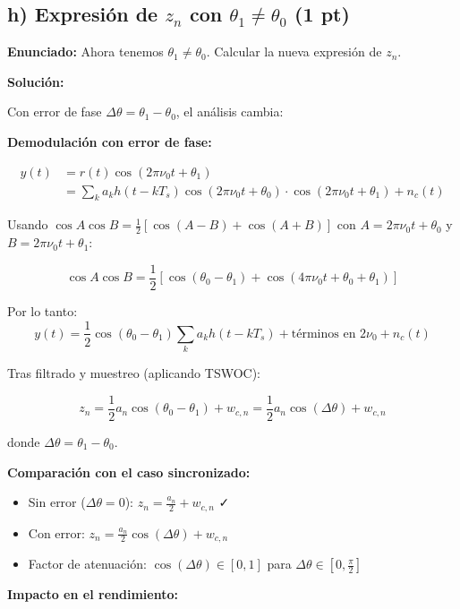 \documentclass[11pt,a4paper]{article}
\begin{document}
\subsection*{h) Expresi\'on de $z_n$ con $\theta_1 \neq \theta_0$ (1 pt)}

\textbf{Enunciado:} Ahora tenemos $\theta_1 \neq \theta_0$. Calcular la nueva expresi\'on de $z_n$.

\vspace{0.3cm}
\textbf{Soluci\'on:}

Con error de fase $\Delta\theta = \theta_1 - \theta_0$, el an\'alisis cambia:

\textbf{Demodulaci\'on con error de fase:}

\begin{align*}
y(t) &= r(t) \cos(2\pi\nu_0 t + \theta_1) \\
&= \sum_{k} a_k h(t-kT_s)\cos(2\pi\nu_0 t + \theta_0) \cdot \cos(2\pi\nu_0 t + \theta_1) + n_c(t)
\end{align*}

Usando $\cos A \cos B = \frac{1}{2}[\cos(A-B) + \cos(A+B)]$ con $A = 2\pi\nu_0 t + \theta_0$ y $B = 2\pi\nu_0 t + \theta_1$:

\[
\cos A \cos B = \frac{1}{2}[\cos(\theta_0 - \theta_1) + \cos(4\pi\nu_0 t + \theta_0 + \theta_1)]
\]

Por lo tanto:
\[
y(t) = \frac{1}{2}\cos(\theta_0 - \theta_1) \sum_k a_k h(t-kT_s) + \text{t\'erminos en } 2\nu_0 + n_c(t)
\]

Tras filtrado y muestreo (aplicando TSWOC):

\[
\boxed{z_n = \frac{1}{2} a_n \cos(\theta_0 - \theta_1) + w_{c,n} = \frac{1}{2} a_n \cos(\Delta\theta) + w_{c,n}}
\]

donde $\Delta\theta = \theta_1 - \theta_0$.

\textbf{Comparaci\'on con el caso sincronizado:}

\begin{itemize}
    \item Sin error ($\Delta\theta = 0$): $z_n = \frac{a_n}{2} + w_{c,n}$ ✓
    
    \item Con error: $z_n = \frac{a_n}{2}\cos(\Delta\theta) + w_{c,n}$
    
    \item Factor de atenuaci\'on: $\cos(\Delta\theta) \in [0, 1]$ para $\Delta\theta \in [0, \frac{\pi}{2}]$
\end{itemize}

\textbf{Impacto en el rendimiento:}
\end{document}

